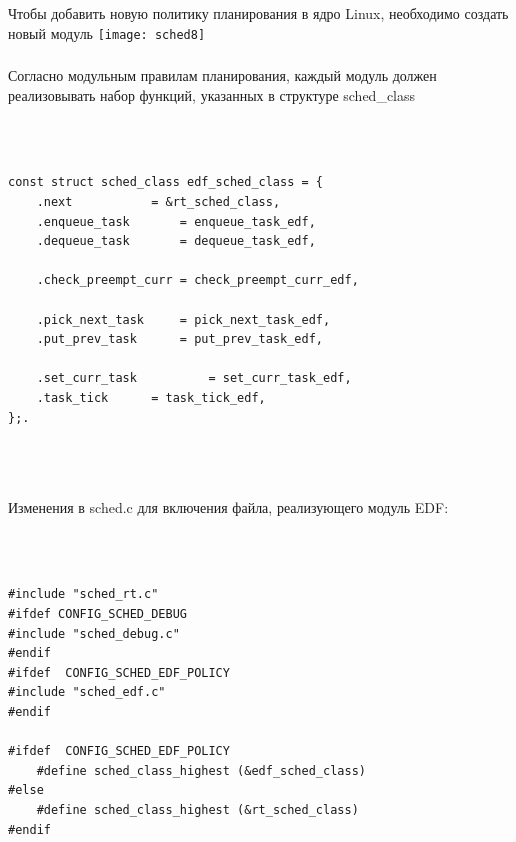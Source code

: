 \documentclass[10pt]{beamer}
\begin{document}
\begin{frame}\frametitle{}
Чтобы добавить новую политику планирования в ядро Linux, необходимо создать новый модуль
\center
\texttt{[image: sched8]}
\end{frame}


\begin{frame}[fragile]\frametitle{}
Согласно модульным правилам планирования, каждый модуль должен реализовывать набор функций, указанных в структуре sched\_class
\center
	\begin{columns}
		\begin{lstlisting}[style=crs_cpp]
		

const struct sched_class edf_sched_class = {
	.next 			= &rt_sched_class,
	.enqueue_task		= enqueue_task_edf,
	.dequeue_task		= dequeue_task_edf,

	.check_preempt_curr	= check_preempt_curr_edf,

	.pick_next_task		= pick_next_task_edf,
	.put_prev_task		= put_prev_task_edf,

	.set_curr_task          = set_curr_task_edf,
	.task_tick		= task_tick_edf,
};. 
 		\end{lstlisting}
 	\end{columns}
\colorbox{white}{\parbox{0.9\textwidth}{{\begin{center}  \end{center} }}}\\
\end{frame}


\begin{frame}[fragile]\frametitle{}
Изменения в sched.c для включения файла, реализующего модуль EDF:
\center
	\begin{columns}
		\column{0.9\textwidth}
		\begin{lstlisting}[style=crs_cpp]
		

#include "sched_rt.c"
#ifdef CONFIG_SCHED_DEBUG
#include "sched_debug.c"
#endif
#ifdef	CONFIG_SCHED_EDF_POLICY
#include "sched_edf.c"
#endif

#ifdef	CONFIG_SCHED_EDF_POLICY
	#define sched_class_highest (&edf_sched_class)
#else
	#define sched_class_highest (&rt_sched_class)
#endif

 		\end{lstlisting}
 	\end{columns}
\colorbox{white}{\parbox{0.9\textwidth}{{\begin{center}  \end{center} }}}\\
\end{frame}
\end{document}
